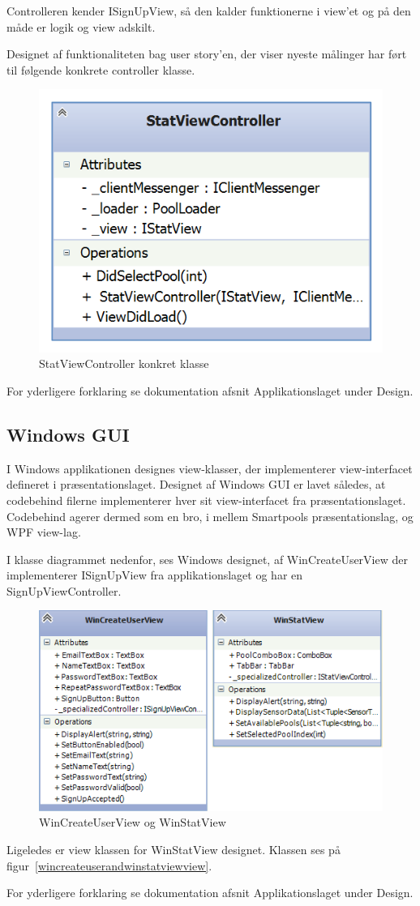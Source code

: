 Controlleren kender ISignUpView, så den kalder funktionerne i view'et og på den måde er logik og view adskilt.

Designet af funktionaliteten bag user story'en, der viser nyeste målinger har ført til følgende konkrete controller klasse.

\begin{figure}
\centering
\includegraphics[width=0.35\linewidth]{figs/design/application_statviewcontroller}
\caption{StatViewController konkret klasse}
\label{fig:application_statviewcontroller}
\end{figure}

For yderligere forklaring se dokumentation afsnit Applikationslaget under Design.

\subsection{Windows GUI}
I Windows applikationen designes view-klasser, der implementerer view-interfacet defineret i præsentationslaget.
Designet af Windows GUI er lavet således, at codebehind filerne implementerer hver sit view-interfacet fra præsentationslaget. Codebehind agerer dermed som en bro, i mellem Smartpools præsentationslag, og WPF view-lag.

I klasse diagrammet nedenfor, ses Windows designet, af WinCreateUserView der implementerer ISignUpView fra applikationslaget og har en SignUpViewController.
\begin{figure}
\centering
\includegraphics[width=0.7\linewidth]{figs/design/wincreateuserandwinstatviewview}
\caption{WinCreateUserView og WinStatView}
\label{fig:wincreateuserandwinstatviewview}
\end{figure}

Ligeledes er view klassen for WinStatView designet.
Klassen ses på figur~\ref{wincreateuserandwinstatviewview}.

For yderligere forklaring se dokumentation afsnit Applikationslaget under Design.

